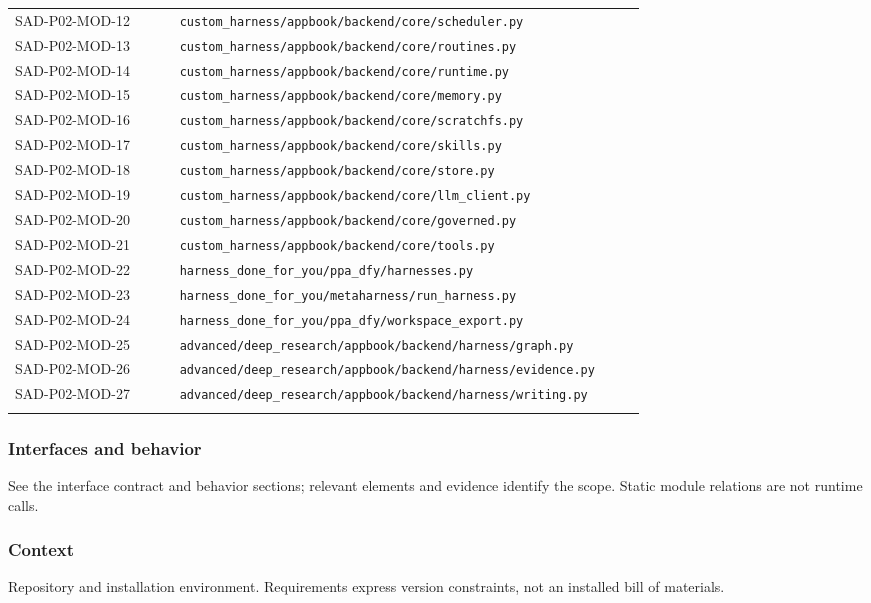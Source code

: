 \documentclass[10pt,letterpaper]{article}
\begin{document}
\begin{longtable}{@{}>{\raggedright\arraybackslash}p{0.24\linewidth}>{\raggedright\arraybackslash}p{0.68\linewidth}@{}}
SAD-P02-MOD-12 & \nolinkurl{custom_harness/appbook/backend/core/scheduler.py}\\\addlinespace
SAD-P02-MOD-13 & \nolinkurl{custom_harness/appbook/backend/core/routines.py}\\\addlinespace
SAD-P02-MOD-14 & \nolinkurl{custom_harness/appbook/backend/core/runtime.py}\\\addlinespace
SAD-P02-MOD-15 & \nolinkurl{custom_harness/appbook/backend/core/memory.py}\\\addlinespace
SAD-P02-MOD-16 & \nolinkurl{custom_harness/appbook/backend/core/scratchfs.py}\\\addlinespace
SAD-P02-MOD-17 & \nolinkurl{custom_harness/appbook/backend/core/skills.py}\\\addlinespace
SAD-P02-MOD-18 & \nolinkurl{custom_harness/appbook/backend/core/store.py}\\\addlinespace
SAD-P02-MOD-19 & \nolinkurl{custom_harness/appbook/backend/core/llm_client.py}\\\addlinespace
SAD-P02-MOD-20 & \nolinkurl{custom_harness/appbook/backend/core/governed.py}\\\addlinespace
SAD-P02-MOD-21 & \nolinkurl{custom_harness/appbook/backend/core/tools.py}\\\addlinespace
SAD-P02-MOD-22 & \nolinkurl{harness_done_for_you/ppa_dfy/harnesses.py}\\\addlinespace
SAD-P02-MOD-23 & \nolinkurl{harness_done_for_you/metaharness/run_harness.py}\\\addlinespace
SAD-P02-MOD-24 & \nolinkurl{harness_done_for_you/ppa_dfy/workspace_export.py}\\\addlinespace
SAD-P02-MOD-25 & \nolinkurl{advanced/deep_research/appbook/backend/harness/graph.py}\\\addlinespace
SAD-P02-MOD-26 & \nolinkurl{advanced/deep_research/appbook/backend/harness/evidence.py}\\\addlinespace
SAD-P02-MOD-27 & \nolinkurl{advanced/deep_research/appbook/backend/harness/writing.py}\\\addlinespace
\bottomrule\end{longtable}

\subsubsection{Interfaces and behavior}
See the interface contract and behavior sections; relevant elements and evidence identify the scope. Static module relations are not runtime calls.
\subsubsection{Context}
Repository and installation environment. Requirements express version constraints, not an installed bill of materials.
\end{document}
